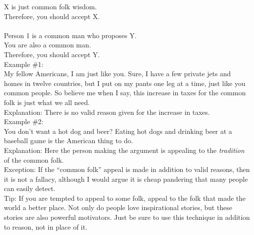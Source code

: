 \documentclass[a4paper,12pt,single,pdftex]{scrartcl}
\begin{document}
    
      X is just common folk wisdom.
    \\

    
      Therefore, you should accept X.
    \\

    
       
    \\

    
      Person 1 is a common man who proposes Y.
    \\

    
      You are also a common man.
    \\

    
      Therefore, you should accept Y.
    \\

    
      Example \#1:
    \\

    
      My fellow Americans, I am just like you.  Sure, I have a few private jets and homes in twelve countries, but I put on my pants one leg at a time, just like you common people.  So believe me when I say, this increase in taxes for the common folk is just what we all need.
    \\

    
      Explanation: There is no valid reason given for the increase in taxes.
    \\

    
      Example \#2:
    \\

    
      You don't want a hot dog and beer?  Eating hot dogs and drinking beer at a baseball game is the American thing to do.
    \\

    
      Explanation: Here the person making the argument is appealing to the {\it tradition} of the common folk.
    \\

    
      Exception: If the “common folk” appeal is made in addition to valid reasons, then it is not a fallacy, although I would argue it is cheap pandering that many people can easily detect.
    \\

    
      Tip: If you are tempted to appeal to some folk, appeal to the folk that made the world a better place. Not only do people love inspirational stories, but these stories are also powerful motivators. Just be sure to use this technique in addition to reason, not in place of it.
    \\
\end{document}
